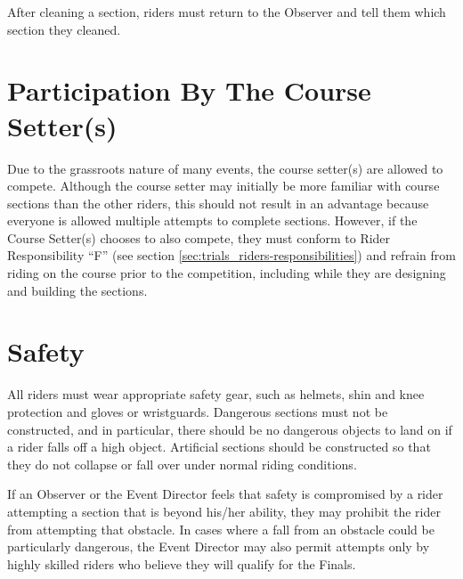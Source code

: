 After cleaning a section, riders must return to the Observer and tell them which section they cleaned.

\section{Participation By The Course Setter(s)}
Due to the grassroots nature of many events, the course setter(s) are allowed to compete. 
Although the course setter may initially be more familiar with course sections than the other riders, this should not result in an advantage because everyone is allowed multiple attempts to complete sections. 
However, if the Course Setter(s) chooses to also compete, they must conform to Rider Responsibility ``F'' (see section \ref{sec:trials_riders-responsibilities}) and refrain from riding on the course prior to the competition, including while they are designing and building the sections.

\section{Safety}
All riders must wear appropriate safety gear, such as helmets, shin and knee protection and gloves or wristguards.
Dangerous sections must not be constructed, and in particular, there should be no dangerous objects to land on if a rider falls off a high object. 
Artificial sections should be constructed so that they do not collapse or fall over under normal riding conditions.

If an Observer or the Event Director feels that safety is compromised by a rider attempting a section that is beyond his/her
ability, they may prohibit the rider from attempting that obstacle. 
In cases where a fall from an obstacle could be particularly dangerous, the Event Director may also permit attempts only by highly skilled riders who believe they will qualify for the Finals.

